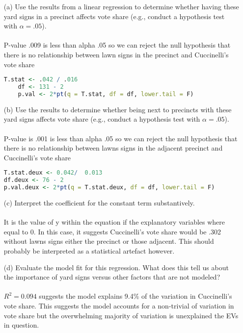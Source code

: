 \documentclass[12pt,letterpaper]{article}
\begin{document}
\vspace{.5cm}
\begin{enumerate}
	\item [(a)] Use the results from a linear regression to determine whether having these yard signs in a precinct affects vote share (e.g., conduct a hypothesis test with $\alpha = .05$).
	\\
	\\ P-value .009 is less than alpha .05 so we can reject the null hypothesis that there is no relationship between lawn signs in the precinct and Cuccinelli's vote share
\begin{lstlisting}[language = R]
	T.stat <- .042 / .016
	df <- 131 - 2
	p.val <- 2*pt(q = T.stat, df = df, lower.tail = F)
\end{lstlisting}

	\newpage		
	\item [(b)]  Use the results to determine whether being
	next to precincts with these yard signs affects vote
	share (e.g., conduct a hypothesis test with $\alpha = .05$).
	\\
	\\ P-value is .001 is less than alpha .05 so we can reject the null hypothesis 
	that there is no relationship between lawns signs in the adjacent precinct and
	Cuccinelli's vote share
\begin{lstlisting}[language=R]
T.stat.deux <- 0.042/  0.013
df.deux <- 76 - 2
p.val.deux <- 2*pt(q = T.stat.deux, df = df, lower.tail = F)
\end{lstlisting}
	
	\vspace{3cm}
	\item [(c)] Interpret the coefficient for the constant term substantively.
	\\
	\\It is the value of y within the equation if the explanatory variables where 
	equal to 0. In this case, it suggests Cuccinelli's vote share would be .302
	without lawns signs either the precinct or those adjacent. This should probably
	be interpreted as a statistical artefact however.
	\vspace{3cm}
	
	\item [(d)] Evaluate the model fit for this regression.  What does this	tell us about the importance of yard signs versus other factors that are not modeled?
	\\
	\\$R^2 = 0.094$ suggests the model explains 9.4\% of the variation in  Cuccinelli's vote share. This suggests the model accounts for a non-trivial of variation in vote share but the overwhelming majority of variation is unexplained the EVs in question.
	
\end{enumerate}  
\end{document}

